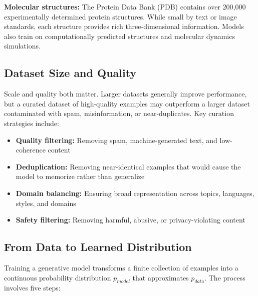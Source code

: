 \documentclass{book}
\begin{document}
\textbf{Molecular structures:} The Protein Data Bank (PDB) contains over
200,000 experimentally determined protein structures. While small by text or
image standards, each structure provides rich three-dimensional information.
Models also train on computationally predicted structures and molecular
dynamics simulations.

\subsection{Dataset Size and Quality}

Scale and quality both matter. Larger datasets generally improve performance,
but a curated dataset of high-quality examples may outperform a larger dataset
contaminated with spam, misinformation, or near-duplicates. Key curation
strategies include:

\begin{itemize}
\item \textbf{Quality filtering:} Removing spam, machine-generated text,
      and low-coherence content
\item \textbf{Deduplication:} Removing near-identical examples that would
      cause the model to memorize rather than generalize
\item \textbf{Domain balancing:} Ensuring broad representation across topics,
      languages, styles, and domains
\item \textbf{Safety filtering:} Removing harmful, abusive, or
      privacy-violating content
\end{itemize}

\subsection{From Data to Learned Distribution}

Training a generative model transforms a finite collection of examples into a
continuous probability distribution $p_{model}$ that approximates $p_{data}$.
The process involves five steps:
\end{document}
